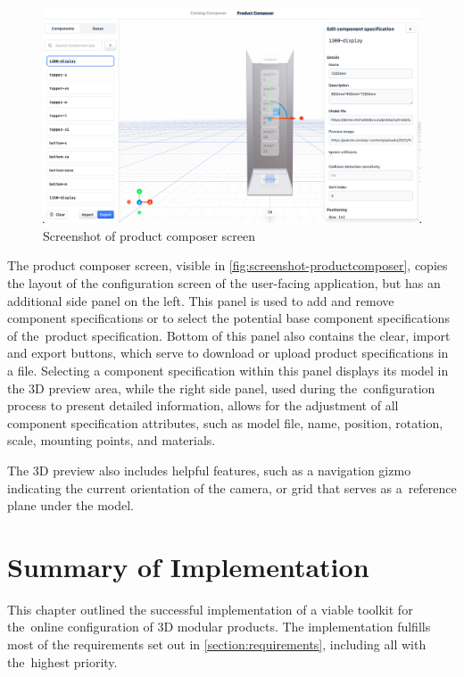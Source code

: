 \begin{figure}[h!]
\centering
\includegraphics[width=\textwidth]{images/screenshot_productcomposer.png}
\caption{Screenshot of product composer screen}
\label{fig:screenshot-productcomposer}
\end{figure}

The product composer screen, visible in \autoref{fig:screenshot-productcomposer}, copies the layout of the configuration screen of the user-facing application, but has an additional side panel on the left. This panel is used to add and remove component specifications or to select the potential base component specifications of the~product specification. Bottom of this panel also contains the clear, import and export buttons, which serve to download or upload product specifications in a  file. Selecting a component specification within this panel displays its model in the 3D preview area, while the right side panel, used during the~configuration process to present detailed information, allows for the adjustment of all component specification attributes, such as model file, name, position, rotation, scale, mounting points, and materials.

The 3D preview also includes helpful features, such as a navigation gizmo indicating the current orientation of the camera, or grid that serves as a~reference plane under the model.


\section{Summary of Implementation} \label{section:requirmenets-evaulation}

This chapter outlined the successful implementation of a viable toolkit for the~online configuration of 3D modular products. The implementation fulfills most of the requirements set out in \autoref{section:requirements}, including all with the~highest priority.

